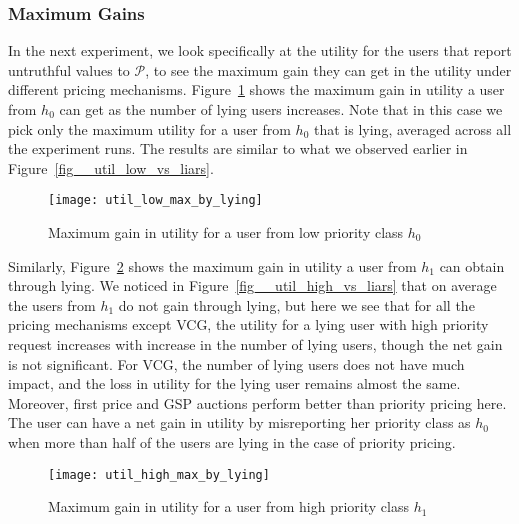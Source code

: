 \subsubsection{Maximum Gains}
In the next experiment, we look specifically at the utility for the users that report untruthful values to $\mathcal{P}$,
to see the maximum gain they can get in the utility under different pricing mechanisms.
Figure~\ref{fig__util_low_max_by_lying} shows the maximum gain in utility a user from $h_0$ can get as the number of lying users increases.
Note that in this case we pick only the maximum utility for a user from $h_0$ that is lying, averaged across all the experiment runs.
The results are similar to what we observed earlier in Figure~\ref{fig__util_low_vs_liars}.

\begin{figure}[tbp]
	\centering
	\texttt{[image: util\_low\_max\_by\_lying]}
	\caption{Maximum gain in utility for a user from low priority class $h_0$}
	\label{fig__util_low_max_by_lying}
\end{figure}

Similarly, Figure~\ref{fig__util_high_max_by_lying} shows the maximum gain in utility a user from $h_1$ can obtain through lying.
We noticed in Figure~\ref{fig__util_high_vs_liars} that on average the users from $h_1$ do not gain through lying,
but here we see that for all the pricing mechanisms except VCG, the utility for a lying user with high priority request increases with increase in the number of lying users, though the net gain is not significant.
For VCG, the number of lying users does not have much impact, and the loss in utility for the lying user remains almost the same.
Moreover, first price and GSP auctions perform better than priority pricing here.
The user can have a net gain in utility by misreporting her priority class as $h_0$ when more than half of the users are lying in the case of priority pricing.

\begin{figure}[tbp]
	\centering
	\texttt{[image: util\_high\_max\_by\_lying]}
	\caption{Maximum gain in utility for a user from high priority class $h_1$}
	\label{fig__util_high_max_by_lying}
\end{figure}

